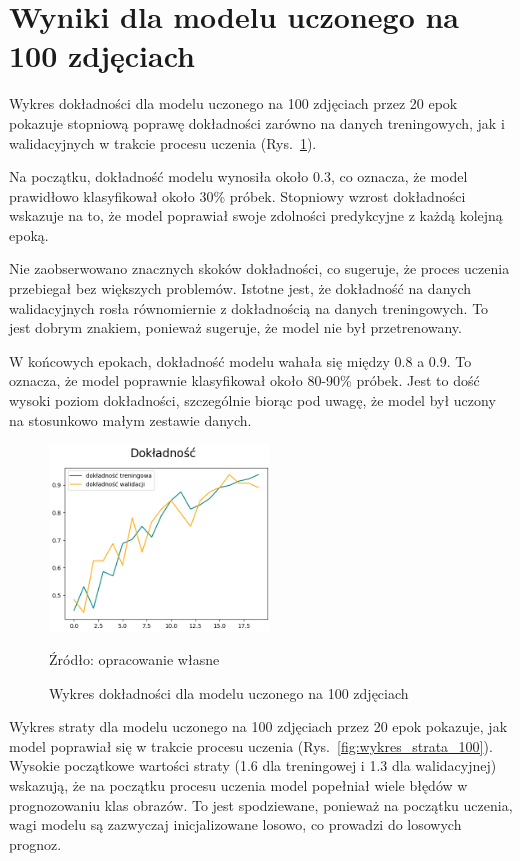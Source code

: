 \section{Wyniki dla modelu uczonego na 100 zdjęciach}

Wykres dokładności dla modelu uczonego na 100 zdjęciach przez 20 epok pokazuje stopniową poprawę dokładności zarówno na danych treningowych, jak i walidacyjnych w trakcie procesu uczenia (Rys.~\ref{fig:wykres_dokladnosc_100}).

Na początku, dokładność modelu wynosiła około 0.3, co oznacza, że model prawidłowo klasyfikował około 30\% próbek. Stopniowy wzrost dokładności wskazuje na to, że model poprawiał swoje zdolności predykcyjne z każdą kolejną epoką.

Nie zaobserwowano znacznych skoków dokładności, co sugeruje, że proces uczenia przebiegał bez większych problemów. Istotne jest, że dokładność na danych walidacyjnych rosła równomiernie z dokładnością na danych treningowych. To jest dobrym znakiem, ponieważ sugeruje, że model nie był przetrenowany.

W końcowych epokach, dokładność modelu wahała się między 0.8 a 0.9. To oznacza, że model poprawnie klasyfikował około 80-90\% próbek. Jest to dość wysoki poziom dokładności, szczególnie biorąc pod uwagę, że model był uczony na stosunkowo małym zestawie danych.

\begin{figure}[htbp]
  \centering
  \caption{Wykres dokładności dla modelu uczonego na 100 zdjęciach}
  \includegraphics[width=220px]{images/dokladnosc_100.png}
  \begin{center}
  \footnotesize{Źródło: opracowanie własne}
  \end{center}
  \label{fig:wykres_dokladnosc_100}
\end{figure}

Wykres straty dla modelu uczonego na 100 zdjęciach przez 20 epok pokazuje, jak model poprawiał się w trakcie procesu uczenia (Rys.~\ref{fig:wykres_strata_100}). Wysokie początkowe wartości straty (1.6 dla treningowej i 1.3 dla walidacyjnej) wskazują, że na początku procesu uczenia model popełniał wiele błędów w prognozowaniu klas obrazów. To jest spodziewane, ponieważ na początku uczenia, wagi modelu są zazwyczaj inicjalizowane losowo, co prowadzi do losowych prognoz.

